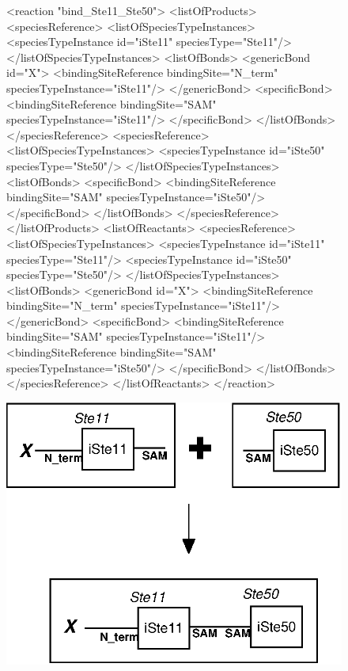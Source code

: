 \documentclass{cekarticle}
\begin{document}
\begin{figure}[h]
\begin{example}
<reaction "bind_Ste11_Ste50">
    <listOfProducts>
        <speciesReference>
            <listOfSpeciesTypeInstances>
                <speciesTypeInstance id="iSte11" speciesType="Ste11"/>
            </listOfSpeciesTypeInstances>
            <listOfBonds>
                <genericBond id="X">
                    <bindingSiteReference bindingSite="N_term" speciesTypeInstance="iSte11"/>
                </genericBond>
                <specificBond>
                    <bindingSiteReference bindingSite="SAM" speciesTypeInstance="iSte11"/>
                </specificBond>
            </listOfBonds>
        </speciesReference>
        <speciesReference>
            <listOfSpeciesTypeInstances>
                <speciesTypeInstance id="iSte50" speciesType="Ste50"/>
            </listOfSpeciesTypeInstances>
            <listOfBonds>
                <specificBond>
                    <bindingSiteReference bindingSite="SAM" speciesTypeInstance="iSte50"/>
                </specificBond>
            </listOfBonds>
        </speciesReference>
    </listOfProducts>
    <listOfReactants>
        <speciesReference>
            <listOfSpeciesTypeInstances>
                <speciesTypeInstance id="iSte11" speciesType="Ste11"/>
                <speciesTypeInstance id="iSte50" speciesType="Ste50"/>
            </listOfSpeciesTypeInstances>
            <listOfBonds>
                <genericBond id="X">
                    <bindingSiteReference bindingSite="N_term" speciesTypeInstance="iSte11"/>
                </genericBond>
                <specificBond>
                    <bindingSiteReference bindingSite="SAM" speciesTypeInstance="iSte11"/>
                    <bindingSiteReference bindingSite="SAM" speciesTypeInstance="iSte50"/>
                </specificBond>
            </listOfBonds>
        </speciesReference>
    </listOfReactants>
</reaction>
\end{example}
  \vspace*{8pt}
  \centering
  \includegraphics[scale = 0.7]{bind_Ste11_Ste50.eps}

\end{figure}
\end{document}
